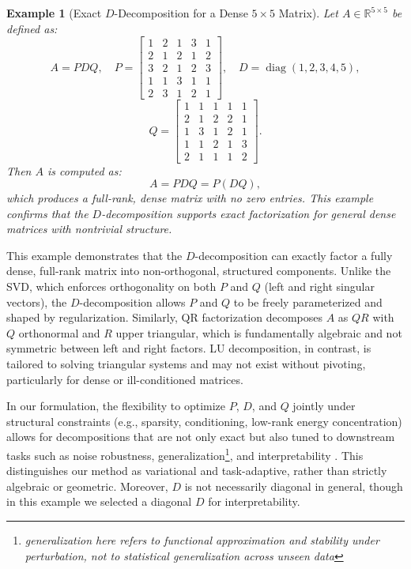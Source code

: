 \documentclass[10pt,a4paper]{article}
\newtheorem{example}[theorem]{\bf Example}
\begin{document}
\begin{example}[Exact $D$-Decomposition for a Dense $5 \times 5$ Matrix]
Let $A \in \mathbb{R}^{5 \times 5}$ be defined as:
\[
A = P D Q, \quad
P = \begin{bmatrix}
1 & 2 & 1 & 3 & 1 \\
2 & 1 & 2 & 1 & 2 \\
3 & 2 & 1 & 2 & 3 \\
1 & 1 & 3 & 1 & 1 \\
2 & 3 & 1 & 2 & 1
\end{bmatrix}, \quad
D = \operatorname{diag}(1, 2, 3, 4, 5),
\]
\[
Q = \begin{bmatrix}
1 & 1 & 1 & 1 & 1 \\
2 & 1 & 2 & 2 & 1 \\
1 & 3 & 1 & 2 & 1 \\
1 & 1 & 2 & 1 & 3 \\
2 & 1 & 1 & 1 & 2
\end{bmatrix}.
\]
Then $A$ is computed as:
\[
A = P D Q = P (D Q),
\]
which produces a full-rank, dense matrix with no zero entries. This example confirms that the $D$-decomposition supports exact factorization for general dense matrices with nontrivial structure.
\end{example}This example demonstrates that the $D$-decomposition can exactly factor a fully dense, full-rank matrix into non-orthogonal, structured components. Unlike the SVD, which enforces orthogonality on both $P$ and $Q$ (left and right singular vectors), the $D$-decomposition allows $P$ and $Q$ to be freely parameterized and shaped by regularization. Similarly, QR factorization decomposes $A$ as $QR$ with $Q$ orthonormal and $R$ upper triangular, which is fundamentally algebraic and not symmetric between left and right factors. LU decomposition, in contrast, is tailored to solving triangular systems and may not exist without pivoting, particularly for dense or ill-conditioned matrices.

In our formulation, the flexibility to optimize $P$, $D$, and $Q$ jointly under structural constraints (e.g., sparsity, conditioning, low-rank energy concentration) allows for decompositions that are not only exact but also tuned to downstream tasks such as noise robustness, generalization\footnote{\emph{generalization here refers to functional approximation and stability under perturbation, not to statistical generalization across unseen data}}, and interpretability \cite{lee2024bmglobal}. This distinguishes our method as variational and task-adaptive, rather than strictly algebraic or geometric. Moreover, $D$ is not necessarily diagonal in general, though in this example we selected a diagonal $D$ for interpretability.
\end{document}
